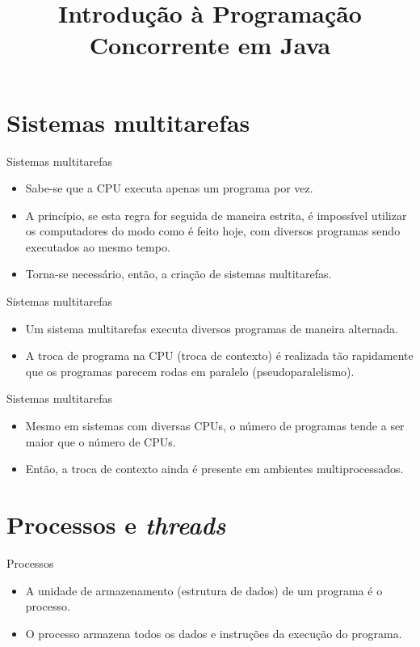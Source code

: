 \documentclass[11pt,justified]{beamer}
\title{Introdução à Programação Concorrente em Java}
\author{}
\date{}
\begin{document}
\begin{frame}[plain]
    \titlepage
\end{frame}

\section{Sistemas multitarefas}

\begin{frame}{Sistemas multitarefas}
    \begin{itemize}
        \item Sabe-se que a CPU executa apenas um programa por vez.
        \item A princípio, se esta regra for seguida de maneira estrita, é impossível utilizar os computadores do modo como é feito hoje, com diversos programas sendo executados ao mesmo tempo.
        \item Torna-se necessário, então, a criação de sistemas multitarefas.
    \end{itemize}
\end{frame}

\begin{frame}{Sistemas multitarefas}
    \begin{itemize}
        \item Um sistema multitarefas executa diversos programas de maneira alternada.
        \item A troca de programa na CPU (troca de contexto) é realizada tão rapidamente que os programas parecem rodas em paralelo (pseudoparalelismo).
    \end{itemize}
\end{frame}

\begin{frame}{Sistemas multitarefas}
    \begin{itemize}
        \item Mesmo em sistemas com diversas CPUs, o número de programas tende a ser maior que o número de CPUs.
        \item Então, a troca de contexto ainda é presente em ambientes multiprocessados.
    \end{itemize}
\end{frame}

\section{Processos e \textit{threads}}

\begin{frame}{Processos}
    \begin{itemize}
        \item A unidade de armazenamento (estrutura de dados) de um programa é o processo.
        \item O processo armazena todos os dados e instruções da execução do programa.
    \end{itemize}
\end{frame}
\end{document}
